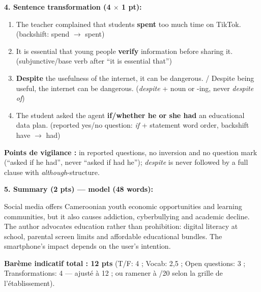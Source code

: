 \documentclass[11pt]{article}
\begin{document}
\begin{corrige}
\textbf{4. Sentence transformation (4 $\times$ 1 pt):}
\begin{enumerate}
\item The teacher complained that students \textbf{spent} too much time on TikTok. (backshift: spend $\to$ spent)
\item It is essential that young people \textbf{verify} information before sharing it. (subjunctive/base verb after ``it is essential that'')
\item \textbf{Despite} the usefulness of the internet, it can be dangerous. / Despite being useful, the internet can be dangerous. (\emph{despite} + noun or -ing, never \emph{despite of})
\item The student asked the agent \textbf{if/whether he or she had} an educational data plan. (reported yes/no question: \emph{if} + statement word order, backshift have $\to$ had)
\end{enumerate}
\textbf{Points de vigilance :} in reported questions, no inversion and no question mark (``asked if he had'', never ``asked if had he''); \emph{despite} is never followed by a full clause with \emph{although}-structure.

\textbf{5. Summary (2 pts) — model (48 words):}

Social media offers Cameroonian youth economic opportunities and learning communities, but it also causes addiction, cyberbullying and academic decline. The author advocates education rather than prohibition: digital literacy at school, parental screen limits and affordable educational bundles. The smartphone's impact depends on the user's intention.

\textbf{Barème indicatif total : 12 pts} (T/F: 4 ; Vocab: 2,5 ; Open questions: 3 ; Transformations: 4 — ajusté à 12 ; ou ramener à /20 selon la grille de l'\'etablissement).
\end{corrige}
\end{document}
